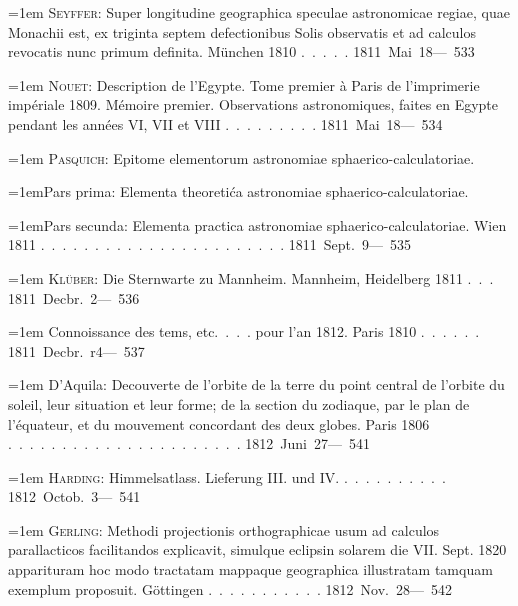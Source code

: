 \noindent\hangindent=1em \textsc{Seyffer}: Super longitudine geographica speculae astronomicae regiae, quae Monachii est, ex triginta septem defectionibus Solis observatis et ad calculos revocatis nunc primum definita. München 1810 \mbox{.\ .\ .\ .\ .} \hfill\mbox{1811 Mai 18}\quad\mbox{--- 533}\par\smallskip
\noindent\hangindent=1em \textsc{Nouet}: Description de l'Egypte. Tome premier à Paris de l'imprimerie impériale 1809. Mémoire premier. Observations astronomiques, faites en Egypte pendant les années VI, VII et VIII \mbox{.\ .\ .\ .\ .\ .\ .\ .\ .} \hfill\mbox{1811 Mai 18}\quad\mbox{--- 534}\par\smallskip
\noindent\hangindent=1em \textsc{Pasquich}: Epitome elementorum astronomiae sphaerico-calculatoriae.\par\noindent\hangindent=1em\hspace{1em}Pars prima: Elementa theoretića astronomiae sphaerico-calculatoriae.\par\noindent\hangindent=1em\hspace{1em}Pars secunda: Elementa practica astronomiae sphaerico-calculatoriae. Wien 1811 \mbox{.\ .\ .\ .\ .\ .\ .\ .\ .\ .\ .\ .\ .\ .\ .\ .\ .\ .\ .\ .\ .\ .\ .} \hfill\mbox{1811 Sept. 9}\quad\mbox{--- 535}\par\smallskip
\noindent\hangindent=1em \textsc{Klüber}: Die Sternwarte zu Mannheim. Mannheim, Heidelberg 1811 \mbox{.\ .\ .} \hfill\mbox{1811 Decbr. 2}\quad\mbox{--- 536}\par\smallskip
\noindent\hangindent=1em Connoissance des tems, etc.\ .\ .\ . pour l'an 1812. Paris 1810 \mbox{.\ .\ .\ .\ .\ .} \hfill\mbox{1811 Decbr. r4}\quad\mbox{--- 537}\par\smallskip
\noindent\hangindent=1em D'Aquila: Decouverte de l'orbite de la terre du point central de l'orbite du soleil, leur situation et leur forme; de la section du zodiaque, par le plan de l'équateur, et du mouvement concordant des deux globes. Paris 1806 \mbox{.\ .\ .\ .\ .\ .\ .\ .\ .\ .\ .\ .\ .\ .\ .\ .\ .\ .\ .\ .\ .\ .} \hfill\mbox{1812 Juni 27}\quad\mbox{--- 541}\par\smallskip
\noindent\hangindent=1em \textsc{Harding}: Himmelsatlass. Lieferung III. und IV. \mbox{.\ .\ .\ .\ .\ .\ .\ .\ .\ .} \hfill\mbox{1812 Octob. 3}\quad\mbox{--- 541}\par\smallskip
\noindent\hangindent=1em \textsc{Gerling}: Methodi projectionis orthographicae usum ad calculos parallacticos facilitandos explicavit, simulque eclipsin solarem die VII. Sept. 1820 apparituram hoc modo tractatam mappaque geographica illustratam tamquam exemplum proposuit. Göttingen \mbox{.\ .\ .\ .\ .\ .\ .\ .\ .\ .\ .} \hfill\mbox{1812 Nov. 28}\quad\mbox{--- 542}\par\smallskip
